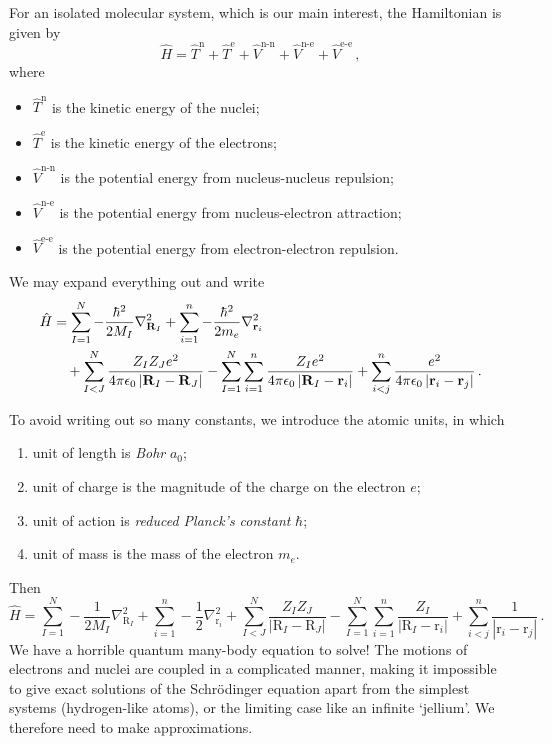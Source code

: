 \documentclass{article}
\theoremstyle{plain}\theoremheaderfont{\normalfont\itshape}\theorembodyfont{\rmfamily}\theoremseparator{.}\newtheorem*{rem}{Remark}\newtheorem*{ex}{Example}\newtheorem*{proof}{Proof}\newtheorem*{altp}{Alternative proof}
\theoremstyle{plain}\theoremheaderfont{\normalfont\bfseries}\theorembodyfont{\rmfamily}\theoremseparator{.}\newtheorem{thm}{Theorem}[section]\newtheorem{lem}[thm]{Lemma}\newtheorem{prop}[thm]{Proposition}\newtheorem*{cor}{Corollary}\newtheorem{defn}[thm]{Definition}\newtheorem{clm}[thm]{Claim}\newtheorem{clminproof}{Claim}\newtheorem{pos}{Postulate}[section]
\theoremstyle{break}\theoremheaderfont{\normalfont\itshape}\theorembodyfont{\rmfamily}\theoremseparator{.\medskip}\newtheorem*{proofskip}{Proof}\newtheorem*{exs}{Examples}\newtheorem*{rems}{Remarks}
\theoremstyle{break}\theoremheaderfont{\normalfont\bfseries}\theorembodyfont{\rmfamily}\theoremseparator{.\medskip}\newtheorem{lemskip}[thm]{Lemma}\newtheorem{defnskip}[thm]{Definition}\newtheorem{propskip}[thm]{Proposition}\newtheorem{thmskip}[thm]{Theorem}
\numberwithin{equation}{section}
\newcommand{\vb}[1]{\bm{\mathrm{#1}}}
\newcommand{\abs}[1]{\left| #1 \right|}
\newcommand{\laplacian}{\nabla^2}
\newcommand{\e}{^{\text{e}}}
\newcommand{\n}{^{\text{n}}}
\begin{document}
    For an isolated molecular system, which is our main interest, the Hamiltonian is given by
    \begin{equation}
        \hat{H}=\hat{T}\n+\hat{T}\e+\hat{V}^{\text{n-n}}+\hat{V}^{\text{n-e}}+\hat{V}^{\text{e-e}}\,,
    \end{equation}
    where
    \begin{itemize}[topsep=0pt]
        \item \(\hat{T}\n\) is the kinetic energy of the nuclei;
        \item \(\hat{T}\e\) is the kinetic energy of the electrons;
        \item \(\hat{V}^{\text{n-n}}\) is the potential energy from nucleus-nucleus repulsion;
        \item \(\hat{V}^{\text{n-e}}\) is the potential energy from nucleus-electron attraction;
        \item \(\hat{V}^{\text{e-e}}\) is the potential energy from electron-electron repulsion.
    \end{itemize}
    We may expand everything out and write
    \begin{align}
        \hat{H}&=\sum_{I=1}^{N}-\frac{\hbar^2}{2M_I}\laplacian_{\vb{R}_I}+\sum_{i=1}^{n}-\frac{\hbar^2}{2m_e}\laplacian_{\vb{r}_i}\notag\\
        &\quad+\sum_{I<J}^{N}\frac{Z_I Z_J e^2}{4\pi\epsilon_0\abs{\vb{R}_I-\vb{R}_J}}-\sum_{I=1}^{N}\sum_{i=1}^{n}\frac{Z_I e^2}{4\pi\epsilon_0\abs{\vb{R}_I-\vb{r}_i}}+\sum_{i<j}^{n}\frac{e^2}{4\pi\epsilon_0\abs{\vb{r}_i-\vb{r}_j}}\,.
    \end{align}

    To avoid writing out so many constants, we introduce the atomic units, in which
    \begin{enumerate}[topsep=0pt,label=(\roman*)]
        \item unit of length is \textit{Bohr} \(a_0\);
        \item unit of charge is the magnitude of the charge on the electron \(e\);
        \item unit of action is \textit{reduced Planck's constant} \(\hbar\);
        \item unit of mass is the mass of the electron \(m_e\).
    \end{enumerate}
    Then
    \begin{equation}
        \hat{H}=\sum_{I=1}^{N}-\frac{1}{2M_I}\laplacian_{\vb{R}_I}+\sum_{i=1}^{n}-\frac{1}{2}\laplacian_{\vb{r}_i}+\sum_{I<J}^{N}\frac{Z_I Z_J}{\abs{\vb{R}_I-\vb{R}_J}}-\sum_{I=1}^{N}\sum_{i=1}^{n}\frac{Z_I}{\abs{\vb{R}_I-\vb{r}_i}}+\sum_{i<j}^{n}\frac{1}{\abs{\vb{r}_i-\vb{r}_j}}\,.
    \end{equation}
    We have a horrible quantum many-body equation to solve! The motions of electrons and nuclei are coupled in a complicated manner, making it impossible to give exact solutions of the Schr\"{o}dinger equation apart from the simplest systems (hydrogen-like atoms), or the limiting case like an infinite `jellium'. We therefore need to make approximations.
\end{document}
